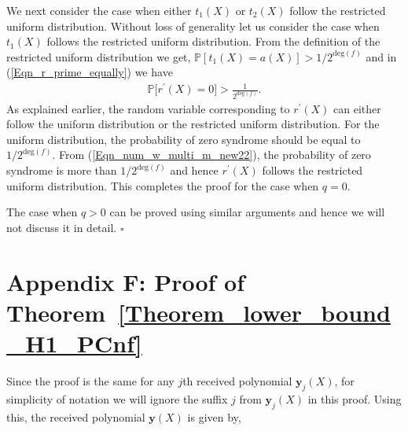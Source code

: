 \documentclass[10pt,journal]{IEEEtran}
\def \deg{{\mathrm{deg}}}
\begin{document}
We next consider the case when either $t_1(X)$ or $t_2(X)$ follow the restricted uniform distribution.
Without loss of generality let us consider the case when
$t_1(X)$ follows the restricted uniform distribution. 
From the definition of the restricted uniform distribution we get, $\mathbb{P}[ t_1(X) = a(X)] > 1/2^{\deg(f)}$ 
and in (\ref{Eqn_r_prime_equally}) we have
% 
\begin{align}
%  
\mathbb{P} \Big[r^{\prime}(X) = 0\Big] > \frac{1}{2^{\deg(f)}}.
\label{Eqn_num_w_multi_m_new22}
% 
\end{align}
% 
As explained earlier, the random variable corresponding to $r^{\prime}(X)$ can either follow the uniform distribution 
or the restricted uniform distribution.
% 
For the uniform distribution, the probability of zero syndrome should be equal to $1/2^{\deg(f)}$.
From (\ref{Eqn_num_w_multi_m_new22}), the probability of zero syndrome is more than $1/2^{\deg(f)}$
and hence $r^{\prime}(X)$ follows the restricted uniform distribution. This completes the proof for the case when $q=0$.

The case when $q>0$ can be proved using similar arguments and hence we will not discuss it in detail.
% 
\hfill $\square$

\section*{Appendix F: Proof of Theorem~\ref{Theorem_lower_bound_H1_PCnf}}
%  
Since the proof is the same for any $j$th received polynomial $\mathbf{y}_j(X)$, for simplicity of notation we will ignore the suffix $j$ from 
$\mathbf{y}_j(X)$ in this proof. Using this, the received polynomial $\mathbf{y}(X)$ is given by,
\end{document}
